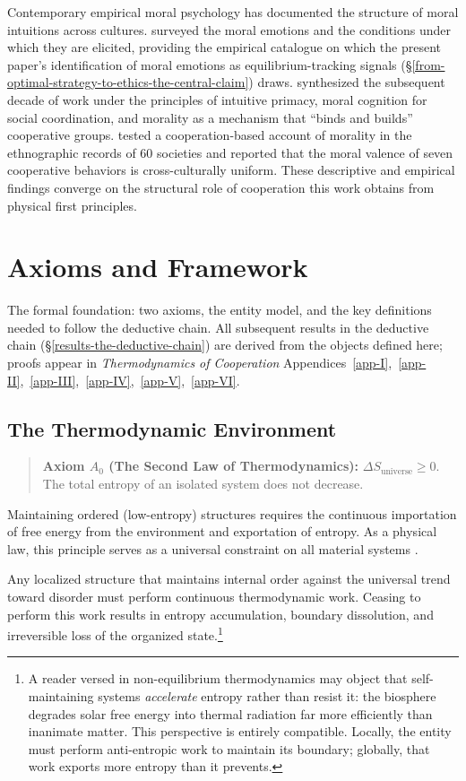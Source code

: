 \documentclass[11pt]{article}
\theoremstyle{plain}
\theoremstyle{definition}
\theoremstyle{remark}
\let\origsection\section
\renewcommand{\section}{\needspace{12\baselineskip}\origsection}
\let\origsubsection\subsection
\renewcommand{\subsection}{\needspace{7\baselineskip}\origsubsection}
\begin{document}
Contemporary empirical moral psychology has documented the structure of
moral intuitions across cultures. \citet{Haidt2003} surveyed the moral
emotions and the conditions under which they are elicited, providing the
empirical catalogue on which the present paper's identification of moral
emotions as equilibrium-tracking signals
(§\ref{from-optimal-strategy-to-ethics-the-central-claim}) draws.
\citet{Haidt2010} synthesized the subsequent decade of work under the
principles of intuitive primacy, moral cognition for social
coordination, and morality as a mechanism that ``binds and builds''
cooperative groups. \citet{Curry2019} tested a cooperation-based account
of morality in the ethnographic records of 60 societies and reported
that the moral valence of seven cooperative behaviors is
cross-culturally uniform. These descriptive and empirical findings
converge on the structural role of cooperation this work obtains from
physical first principles.

\section{Axioms and Framework}\label{axioms-and-framework}

The formal foundation: two axioms, the entity model, and the key
definitions needed to follow the deductive chain. All subsequent results
in the deductive chain (§\ref{results-the-deductive-chain}) are derived
from the objects defined here; proofs appear in \emph{Thermodynamics of
Cooperation}
Appendices~\ref{app-I},~\ref{app-II},~\ref{app-III},~\ref{app-IV},~\ref{app-V},~\ref{app-VI}.

\subsection{The Thermodynamic
Environment}\label{the-thermodynamic-environment}

\begin{quote}
\textbf{Axiom \(A_0\) (The Second Law of Thermodynamics):}
\(\Delta S_{\text{universe}} \geq 0\). The total entropy of an isolated
system does not decrease.
\end{quote}

Maintaining ordered (low-entropy) structures requires the continuous
importation of free energy from the environment and exportation of
entropy. As a physical law, this principle serves as a universal
constraint on all material systems
\citep{Clausius1865, Boltzmann1877, Planck1900}.

Any localized structure that maintains internal order against the
universal trend toward disorder must perform continuous thermodynamic
work. Ceasing to perform this work results in entropy accumulation,
boundary dissolution, and irreversible loss of the organized
state.\footnote{A reader versed in non-equilibrium thermodynamics may
  object that self-maintaining systems \emph{accelerate} entropy rather
  than resist it: the biosphere degrades solar free energy into thermal
  radiation far more efficiently than inanimate matter. This perspective
  is entirely compatible. Locally, the entity must perform anti-entropic
  work to maintain its boundary; globally, that work exports more
  entropy than it prevents.}
\end{document}
